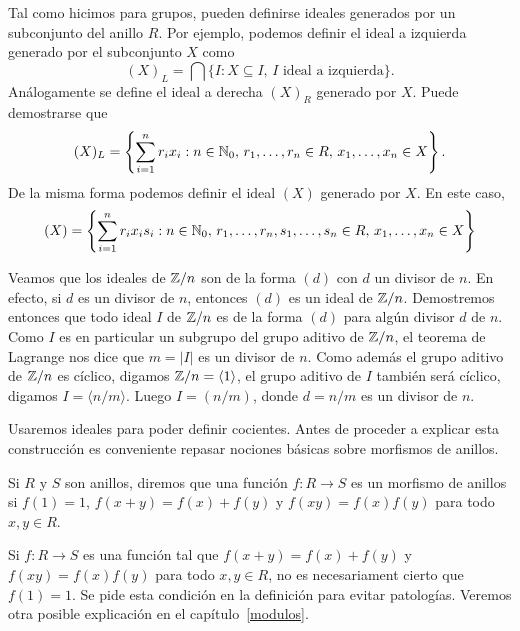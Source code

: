 
Tal como hicimos para grupos, pueden definirse ideales generados por un subconjunto del anillo $R$. Por ejemplo, 
podemos definir el ideal a izquierda generado por el subconjunto $X$ como
\[
(X)_L = \bigcap\{I:X\subseteq I,\,I\text{ ideal a izquierda}\}.
\]
Análogamente se define el ideal a derecha $(X)_R$ generado por $X$.  
Puede demostrarse que
\[
(X)_L=\left\{\sum_{i=1}^nr_ix_i:n\in\mathbb{N}_0,\,r_1,\dots,r_n\in R,\,x_1,\dots,x_n\in X\right\}. 
\]
De la misma forma podemos definir el ideal $(X)$ generado por $X$. En este caso, 
\[
(X) = \left\{\sum_{i=1}^nr_ix_is_i:n\in\mathbb{N}_0,\,r_1,\dots,r_n,s_1,\dots,s_n\in R,\,x_1,\dots,x_n\in X\right\}
\]

\begin{example}
Veamos que los ideales de $\mathbb{Z}/n$ son de la forma $(d)$ con $d$ un divisor de $n$. En efecto, si 
$d$ es un divisor de $n$, entonces $(d)$ es un ideal de $\mathbb{Z}/n$. Demostremos entonces
que todo ideal $I$ de $\mathbb{Z}/n$ es de la forma $(d)$ para algún divisor $d$ de $n$. Como
$I$ es en particular un subgrupo del grupo aditivo de $\mathbb{Z}/n$, el teorema de Lagrange nos dice que 
$m=|I|$ es un divisor de $n$. Como además el grupo
aditivo de $\mathbb{Z}/n$ es cíclico, digamos $\mathbb{Z}/n=\langle 1\rangle$, el grupo aditivo de $I$ también será cíclico, digamos
$I=\langle n/m\rangle$. Luego $I=(n/m)$, donde $d=n/m$ es un divisor de $n$.  
\end{example}

Usaremos ideales para poder definir cocientes. 
Antes de proceder a explicar esta construcción es 
conveniente repasar nociones básicas sobre morfismos de anillos. 

\begin{definition}
Si $R$ y $S$ son anillos, diremos que una función $f\colon R\to S$ es un morfismo de anillos si $f(1)=1$, 
$f(x+y)=f(x)+f(y)$ y $f(xy)=f(x)f(y)$ para todo $x,y\in R$. 	
\end{definition}

Si $f\colon R\to S$ es una función tal que $f(x+y)=f(x)+f(y)$ y $f(xy)=f(x)f(y)$ para todo $x,y\in R$, 
no es necesariament cierto que $f(1)=1$. Se pide esta condición en la definición para evitar patologías. Veremos 
otra posible explicación en el capítulo~\ref{modulos}.


